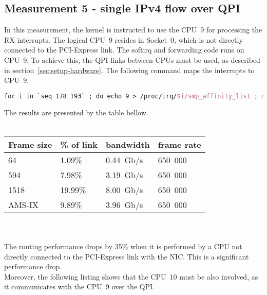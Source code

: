 
\subsection{Measurement 5 - single IPv4 flow over QPI}
In this measurement, the kernel is instructed to use the CPU~9 for processing the RX interrupts.
The logical CPU~9 resides in Socket~0, which is not directly connected to the PCI-Express link.
The softirq and forwarding code runs on CPU~9.
To achieve this, the QPI links between CPUs must be used, as described in section~\ref{sec:setup-hardware}.
The following command maps the interrupts to CPU~9.
\begin{lstlisting}[language=TeX]
for i in `seq 178 193` ; do echo 9 > /proc/irq/$i/smp_affinity_list ; done
\end{lstlisting}
The results are presented by the table bellow.
\\
\\
\begin{tabular}{ | l | l | l | l | }
\hline
Frame size & \% of link & bandwidth & frame rate \\
\hline
64     &  1.09\% &  0.44~Gb/s & 650~000 \\
594    &  7.98\% &  3.19~Gb/s & 650~000 \\
1518   & 19.99\% &  8.00~Gb/s & 650~000 \\
AMS-IX &  9.89\% &  3.96~Gb/s & 650~000 \\
\hline
\end{tabular}
\\
\\
The routing performance drops by 35\% when it is performed by
a CPU not directly connected to the PCI-Express link with the NIC.
This is a significant performance drop.
\\
Moreover, the following listing shows that the CPU~10 must be also involved, as
it communicates with the CPU~9 over the QPI.
\newpage
